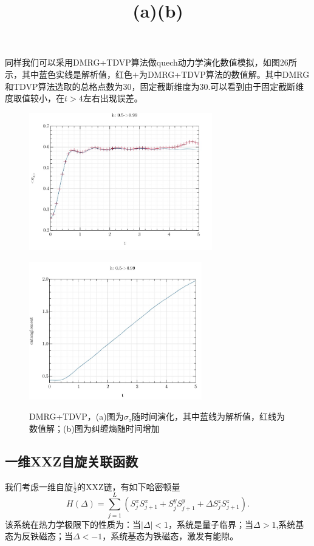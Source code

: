 \documentclass[12pt]{article}
\begin{document}
     同样我们可以采用DMRG+TDVP算法\cite{fishman2020itensor}做quech动力学演化数值模拟，如图26所示，其中蓝色实线是解析值，红色$+$为DMRG+TDVP算法的数值解。其中DMRG和TDVP算法选取的总格点数为30，固定截断维度为30.可以看到由于固定截断维度取值较小，在$t>4$左右出现误差。
     \begin{figure}[H]
     	\centering
     	\begin{minipage}{0.49\linewidth}
     		\centering
     		\includegraphics[width=1\linewidth, height=170pt]{TFIMSzt7}
     		\title{(a)}
     		\label{fig:33}
     	\end{minipage}
     	\begin{minipage}{0.49\linewidth}
     		\centering
     		\includegraphics[width=1\linewidth, height=170pt]{tdvpe}
     		\title{(b)}
     		\label{fig:34}
     	\end{minipage}
        \caption{DMRG+TDVP，(a)图为$\sigma_z$随时间演化，其中蓝线为解析值，红线为数值解；(b)图为纠缠熵随时间增加}
     \end{figure}

      
      \subsection{一维XXZ自旋关联函数}
      我们考虑一维自旋$\frac{1}{2}$的XXZ链，有如下哈密顿量
      \begin{equation}  H(\Delta)=\sum_{j=1}^{L}(S_j^xS_{j+1}^x+S_j^yS_{j+1}^y+\Delta S_j^zS_{j+1}^z) .\end{equation}
      该系统在热力学极限下的性质为：当$|\Delta|<1$，系统是量子临界；当$\Delta>1$,系统基态为反铁磁态；当$\Delta<-1$，系统基态为铁磁态，激发有能隙\cite{collura2015quantum}。
      
\end{document}
